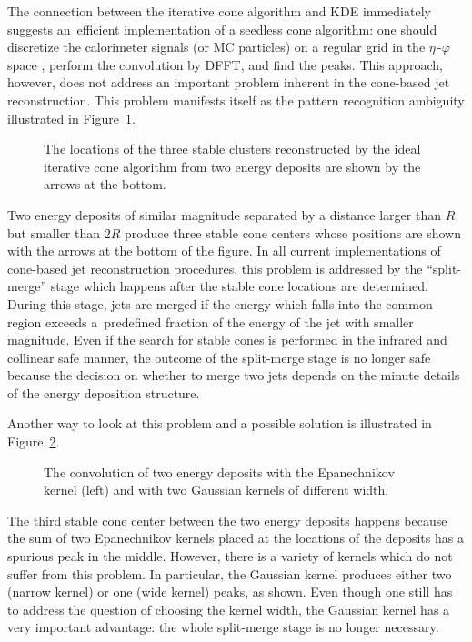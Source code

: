 \documentclass[epsf,12pt,titlepage]{article}
\def\epspace {$\eta$\,-$\varphi$ space }
\begin{document}
The connection between the
iterative cone algorithm and KDE immediately suggests 
an~efficient implementation of a seedless cone algorithm: one should
discretize the calorimeter signals (or MC particles) on a regular
grid in the \epspace\!\!, perform the convolution
by DFFT, and find the peaks. This approach, however, does not
address an important problem inherent in the cone-based jet
reconstruction. This problem manifests itself as the pattern recognition
ambiguity illustrated in Figure~\ref{split}.
\begin{figure}[h]
\begin{center}
\leavevmode
\epsfxsize=2.5in
\caption{The locations of the three stable clusters reconstructed by the ideal
iterative cone algorithm from two energy deposits are shown by the arrows
at the bottom.}
\label{split}
\end{center}
\end{figure}
Two energy deposits of similar magnitude
separated by a distance larger than $R$ but
smaller than $2 R$ produce three stable cone centers whose positions
are shown with the arrows at the bottom of the figure. In all current
implementations of cone-based jet reconstruction procedures, this
problem is addressed by the ``split-merge'' stage which happens after the
stable cone locations are determined. During this stage,
jets are merged if the energy which falls into the common region
exceeds a~predefined fraction of the energy of the jet with
smaller magnitude. Even if the search for stable
cones is performed in the infrared and collinear safe manner, the
outcome of the split-merge stage is no longer safe
because the decision on whether to merge two jets depends on the
minute details of the energy deposition structure.

Another way to look at this problem and a possible solution is illustrated
in Figure~\ref{trouble}.
\begin{figure}[t]
\begin{center}
\leavevmode
\epsfxsize=6.5in
\caption{The convolution of two energy deposits with the Epanechnikov kernel (left)
and with two Gaussian kernels of different width.}
\label{trouble}
\end{center}
\end{figure}
The third stable cone center between the two energy
deposits happens because the sum of two Epanechnikov kernels placed
at the locations of the deposits has a spurious peak in the middle. However,
there is a variety of kernels which do not suffer from this problem.
In particular, the Gaussian kernel produces either two (narrow kernel) or one
(wide kernel) peaks, as shown. Even though
one still has to address the question
of choosing the kernel width, the Gaussian kernel has
a very important advantage: the whole split-merge stage is no
longer necessary.
\end{document}
